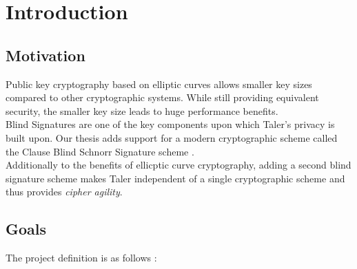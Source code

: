 \chapter{Introduction}

\section{Motivation}
Public key cryptography based on elliptic curves allows smaller key sizes compared to other cryptographic systems.
While still providing equivalent security, the smaller key size leads to huge performance benefits.
\\
Blind Signatures are one of the key components upon which Taler's privacy is built upon.
Our thesis adds support for a modern cryptographic scheme called the Clause Blind Schnorr Signature scheme \cite{cryptoeprint:2019:877}.\\
Additionally to the benefits of ellicptic curve cryptography, adding a second blind signature scheme makes Taler independent of a single cryptographic scheme and thus provides \textit{cipher agility}.


\section{Goals}
\label{sec:goals}
The project definition is as follows \cite{project-definition}:

